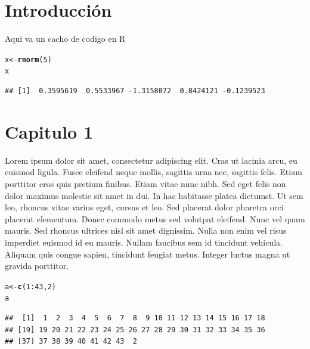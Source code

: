\documentclass[12pt, twoside]{report}\usepackage[]{graphicx}\usepackage[]{color}
\makeatletter
\newcommand{\hlnum}[1]{\textcolor[rgb]{0.686,0.059,0.569}{#1}}%
\newcommand{\hlopt}[1]{\textcolor[rgb]{0,0,0}{#1}}%
\newcommand{\hlstd}[1]{\textcolor[rgb]{0.345,0.345,0.345}{#1}}%
\newcommand{\hlkwb}[1]{\textcolor[rgb]{0.69,0.353,0.396}{#1}}%
\newcommand{\hlkwd}[1]{\textcolor[rgb]{0.737,0.353,0.396}{\textbf{#1}}}%
\newenvironment{kframe}{%
 \def\at@end@of@kframe{}%
 \ifinner\ifhmode%
  \def\at@end@of@kframe{\end{minipage}}%
  \begin{minipage}{\columnwidth}%
 \fi\fi%
 \def\FrameCommand##1{\hskip\@totalleftmargin \hskip-\fboxsep
 \colorbox{shadecolor}{##1}\hskip-\fboxsep
     \hskip-\linewidth \hskip-\@totalleftmargin \hskip\columnwidth}%
 \MakeFramed {\advance\hsize-\width
   \@totalleftmargin\z@ \linewidth\hsize
   \@setminipage}}%
 {\par\unskip\endMakeFramed%
 \at@end@of@kframe}
\newenvironment{knitrout}{}{} %
\makeatother
\begin{document}
\chapter{Introducción}

Aqui va un cacho de codigo en R

\begin{knitrout}
\color{fgcolor}\begin{kframe}
\begin{alltt}
\hlstd{x} \hlkwb{<-} \hlkwd{rnorm}\hlstd{(}\hlnum{5}\hlstd{)}
\hlstd{x}
\end{alltt}
\begin{verbatim}
## [1]  0.3595619  0.5533967 -1.3158072  0.8424121 -0.1239523
\end{verbatim}
\end{kframe}
\end{knitrout}

\chapter{Capitulo 1}

Lorem ipsum dolor sit amet, consectetur adipiscing elit. Cras ut lacinia arcu, eu euismod ligula. Fusce eleifend neque mollis, sagittis urna nec, sagittis felis. Etiam porttitor eros quis pretium finibus. Etiam vitae nunc nibh. Sed eget felis non dolor maximus molestie sit amet in dui. In hac habitasse platea dictumst. Ut sem leo, rhoncus vitae varius eget, cursus et leo. Sed placerat dolor pharetra orci placerat elementum. Donec commodo metus sed volutpat eleifend. Nunc vel quam mauris. Sed rhoncus ultrices nisl sit amet dignissim. Nulla non enim vel risus imperdiet euismod id eu mauris. Nullam faucibus sem id tincidunt vehicula. Aliquam quis congue sapien, tincidunt feugiat metus. Integer luctus magna ut gravida porttitor.

\begin{knitrout}
\color{fgcolor}\begin{kframe}
\begin{alltt}
\hlstd{a} \hlkwb{<-} \hlkwd{c}\hlstd{(}\hlnum{1}\hlopt{:}\hlnum{43}\hlstd{,} \hlnum{2}\hlstd{)}
\hlstd{a}
\end{alltt}
\begin{verbatim}
##  [1]  1  2  3  4  5  6  7  8  9 10 11 12 13 14 15 16 17 18
## [19] 19 20 21 22 23 24 25 26 27 28 29 30 31 32 33 34 35 36
## [37] 37 38 39 40 41 42 43  2
\end{verbatim}
\end{kframe}
\end{knitrout}
\end{document}
